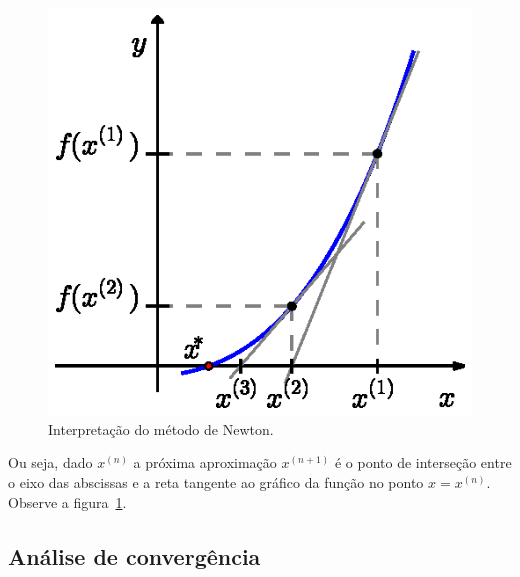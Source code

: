 \begin{figure}[h]
  \centering
  \includegraphics{./cap_equacao1d/pics/metodo_de_Newton/metodo_de_Newton.eps}  
  \caption{Interpretação do método de Newton.}
  \label{fig:metodo_de_Newton}
\end{figure}

Ou seja, dado $x^{(n)}$ a próxima aproximação $x^{(n+1)}$ é o ponto de interseção entre o eixo das abscissas e a reta tangente ao gráfico da função no ponto $x = x^{(n)}$. Observe a figura~\ref{fig:metodo_de_Newton}.

\subsection{Análise de convergência}\label{Analise_conv_Newton}

